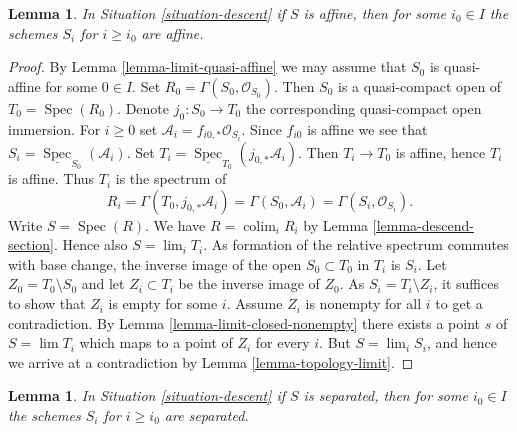 \documentclass{stacks-project}
\theoremstyle{plain}
\newtheorem{lemma}[subsection]{Lemma}
\theoremstyle{definition}
\theoremstyle{remark}
\numberwithin{equation}{subsection}
\def\lim{\mathop{\mathrm{lim}}\nolimits}
\def\colim{\mathop{\mathrm{colim}}\nolimits}
\def\Spec{\mathop{\mathrm{Spec}}}
\begin{document}
\begin{lemma}
\label{lemma-limit-affine}
In Situation \ref{situation-descent} if $S$ is affine,
then for some $i_0 \in I$ the schemes $S_i$ for $i \geq i_0$
are affine.
\end{lemma}

\begin{proof}
By Lemma \ref{lemma-limit-quasi-affine} we may assume that $S_0$ is
quasi-affine for some $0 \in I$. Set $R_0 = \Gamma(S_0, \mathcal{O}_{S_0})$.
Then $S_0$ is a quasi-compact open of $T_0 = \Spec(R_0)$. Denote
$j_0 : S_0 \to T_0$ the corresponding quasi-compact open immersion.
For $i \geq 0$ set $\mathcal{A}_i = f_{i0, *}\mathcal{O}_{S_i}$.
Since $f_{i0}$ is affine we see that
$S_i = \underline{\Spec}_{S_0}(\mathcal{A}_i)$.
Set $T_i = \underline{\Spec}_{T_0}(j_{0, *}\mathcal{A}_i)$.
Then $T_i \to T_0$ is affine, hence $T_i$ is affine. Thus
$T_i$ is the spectrum of
$$
R_i = \Gamma(T_0, j_{0, *}\mathcal{A}_i) = \Gamma(S_0, \mathcal{A}_i) =
\Gamma(S_i, \mathcal{O}_{S_i}).
$$
Write $S = \Spec(R)$. We have $R = \colim_i R_i$
by Lemma \ref{lemma-descend-section}.
Hence also $S = \lim_i T_i$. As formation of the relative spectrum commutes
with base change, the inverse image
of the open $S_0 \subset T_0$ in $T_i$ is $S_i$.
Let $Z_0 = T_0 \setminus S_0$ and let $Z_i \subset T_i$
be the inverse image of $Z_0$. As $S_i = T_i \setminus Z_i$, it suffices
to show that $Z_i$ is empty for some $i$. Assume $Z_i$ is nonempty for all
$i$ to get a contradiction. By Lemma \ref{lemma-limit-closed-nonempty}
there exists a point $s$ of $S = \lim T_i$ which maps to a point of $Z_i$
for every $i$. But $S = \lim_i S_i$, and hence we arrive at a contradiction
by Lemma \ref{lemma-topology-limit}.
\end{proof}

\begin{lemma}
\label{lemma-limit-separated}
In Situation \ref{situation-descent} if $S$ is separated,
then for some $i_0 \in I$ the schemes $S_i$ for $i \geq i_0$
are separated.
\end{lemma}
\end{document}
